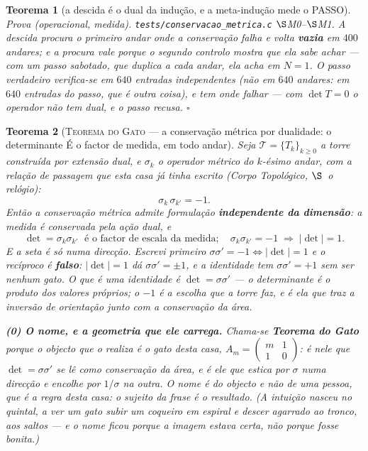\documentclass[11pt,a4paper]{article}
\newtheorem{teorema}{Teorema}
\newcommand{\code}[1]{\texttt{\small #1}}
\begin{document}
\begin{teorema}[a descida é o dual da indução, e a meta-indução mede o
PASSO]
\emph{Prova (operacional, medida).} \code{tests/conservacao\_metrica.c}
$\S$M0--$\S$M1. A descida procura o primeiro andar onde a conservação
falha e volta \textbf{vazia} em $400$ andares; e a procura vale porque o
segundo controlo mostra que ela sabe achar --- com um passo
\emph{sabotado}, que duplica a cada andar, ela acha em $N=1$. O passo
verdadeiro verifica-se em $640$ entradas independentes (não em $640$
andares: em $640$ \emph{entradas} do passo, que é outra coisa), e tem
onde falhar --- com $\det T=0$ o operador não tem dual, e o passo
recusa. $\square$
\end{teorema}

\begin{teorema}[\textsc{Teorema do Gato} --- a conservação métrica por
dualidade: o determinante É o factor de medida, em todo
andar]\label{thm:gato}
Seja $\mathcal{T}=\{T_{k}\}_{k\ge0}$ a torre construída por extensão
dual, e $\sigma_{k}$ o operador métrico do $k$-ésimo andar, com a
relação de passagem que esta casa já tinha escrito
(\emph{Corpo Topológico}, \emph{$\S$~o relógio}):
\[
\sigma_{k}\,\sigma_{k'}=-1 .
\]
Então a conservação métrica admite formulação \textbf{independente da
dimensão}: a medida é conservada pela ação dual, e
\[
\boxed{\;\det=\sigma_{k}\sigma_{k'}\;\text{ é o factor de escala da
medida};\quad
\sigma_{k}\sigma_{k'}=-1\;\Longrightarrow\;|\det|=1.\;}
\]
\emph{E a seta é só numa direcção.} Escrevi primeiro
$\sigma\sigma'=-1\Leftrightarrow|\det|=1$ e o recíproco é \textbf{falso}:
$|\det|=1$ dá $\sigma\sigma'=\pm1$, e a identidade tem $\sigma\sigma'=+1$
sem ser nenhum gato. O que é uma identidade é $\det=\sigma\sigma'$ --- o
determinante \emph{é} o produto dos valores próprios; o $-1$ é a escolha
que a torre faz, e é ela que traz a inversão de orientação junto com a
conservação da área.

\textbf{(0) O nome, e a geometria que ele carrega.} Chama-se
\textbf{Teorema do Gato} porque o objecto que o realiza é o \emph{gato}
desta casa, $A_{m}=\begin{pmatrix} m & 1\\ 1 & 0\end{pmatrix}$: é nele
que $\det=\sigma\sigma'$ se lê como conservação da área, e é ele que
\emph{estica por $\sigma$ numa direcção e encolhe por $1/\sigma$ na
outra}. O nome é do objecto e não de uma pessoa, que é a regra desta
casa: o sujeito da frase é o resultado. (A intuição nasceu no quintal, a
ver um gato subir um coqueiro em espiral e descer agarrado ao tronco,
aos saltos --- e o nome ficou porque a imagem estava certa, não porque
fosse bonita.)


\end{teorema}
\end{document}

